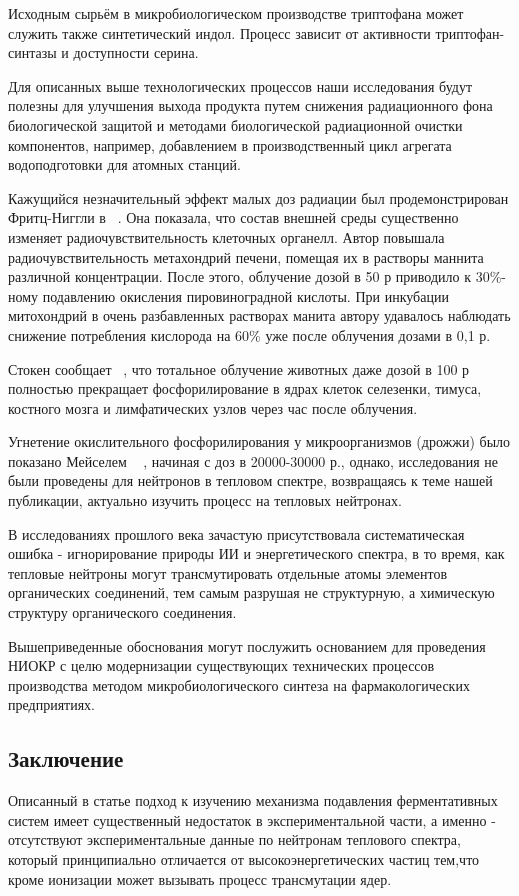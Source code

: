 \documentclass[11pt]{article}
\begin{document}
Исходным сырьём в микробиологическом производстве триптофана может служить также синтетический индол. Процесс зависит от активности триптофан-синтазы и доступности серина.

Для описанных выше технологических процессов наши исследования будут полезны для улучшения выхода продукта путем снижения радиационного фона биологической защитой и методами биологической радиационной очистки компонентов, например, добавлением в производственный цикл агрегата водоподготовки для атомных станций. 

Кажущийся незначительный эффект малых доз радиации был продемонстрирован Фритц-Ниггли в  ~\cite{fnfritz_1, fnfritz_2}. Она показала, что состав внешней среды существенно изменяет радиочувствительность клеточных органелл. Автор повышала радиочувствительность метахондрий печени, помещая их в растворы маннита различной концентрации. После этого, облучение дозой в 50 р приводило к 30\%-ному подавлению окисления пировиноградной кислоты. При инкубации митохондрий в очень разбавленных растворах манита автору удавалось наблюдать снижение потребления кислорода на 60\% уже после облучения дозами в 0,1 р. 

Стокен сообщает ~\cite{stoken}, что тотальное облучение животных даже дозой в 100 р полностью прекращает фосфорилирование в ядрах клеток селезенки, тимуса, костного мозга и лимфатических узлов через час после облучения.

Угнетение окислительного фосфорилирования у микроорганизмов (дрожжи) было показано Мейселем ~\cite{meisel} , начиная с доз в 20000-30000 р., однако, исследования не были проведены для нейтронов в тепловом спектре, возвращаясь к теме нашей публикации, актуально изучить процесс на тепловых нейтронах. 

В исследованиях прошлого века зачастую присутствовала систематическая ошибка - игнорирование природы ИИ и энергетического спектра, в то время, как тепловые нейтроны могут трансмутировать отдельные атомы элементов органических соединений, тем самым разрушая не структурную, а химическую структуру органического соединения.

Вышеприведенные обоснования могут послужить основанием для проведения НИОКР с целю модернизации существующих технических процессов производства методом микробиологического синтеза на фармакологических предприятиях.

\subsection{Заключение}
Описанный в статье подход к изучению механизма подавления ферментативных систем имеет существенный недостаток в экспериментальной части, а именно - отсутствуют экспериментальные данные по нейтронам теплового спектра, который принципиально отличается от высокоэнергетических частиц тем,что кроме ионизации может вызывать процесс трансмутации ядер.
\end{document}
